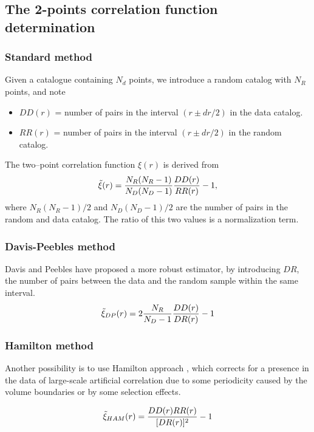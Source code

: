  
\subsection{The 2-points correlation function determination}
\subsubsection*{Standard method}
Given a catalogue containing $N_d$ points, we introduce a random
catalog with $N_R$ points, and note
\begin{itemize}
\item $DD(r)$ = number of pairs in the interval $(r \pm dr/2)$ in the
  data catalog.
\item $RR(r)$ = number of pairs in the interval $(r \pm dr/2)$ in the
  random catalog.
\end{itemize}
The two--point correlation function $\xi(r)$ is derived from
\begin{equation}
\tilde \xi(r) =  {N_R(N_R-1) \over N_D(N_D-1)} {DD(r) \over RR(r)} -1,
\label{std_method}
\end{equation}
where $N_R(N_R-1)/2$ and $ N_D(N_D-1)/2$ are the number of pairs in
the random and data catalog. The ratio of this two values is a
normalization term.

\subsubsection*{Davis-Peebles method}
Davis and Peebles \cite{cf:davis83} have proposed a more robust
estimator, by introducing $DR$, the number of pairs between the data
and the random sample within the same interval.
\begin{equation}
\tilde \xi_{DP}(r) =  2{N_R \over N_D-1} {DD(r) \over DR(r)} -1
\label{dp_method}
\end{equation}

\subsubsection*{Hamilton method}
Another possibility is to use Hamilton approach \cite{cf:hamilton93},
which corrects for a presence in the data of large-scale artificial
correlation due to some periodicity caused by the volume boundaries or 
by some selection effects.

\begin{equation}
\tilde \xi_{HAM}(r) =   {DD(r) RR(r) \over [DR(r)]^2} -1
\label{ham_method}
\end{equation}

